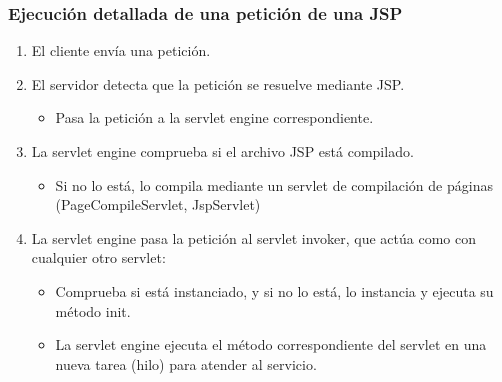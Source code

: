 \documentclass{apuntes}
\begin{document}
\subsubsection{Ejecución detallada de una petición de una JSP}
\begin{enumerate}
\item El cliente envía una petición.
\item El servidor detecta que la petición se resuelve mediante JSP.
\begin{itemize}
\item Pasa la petición a la servlet engine correspondiente.
\end{itemize}
\item La servlet engine comprueba si el archivo JSP está compilado.
\begin{itemize}
\item Si no lo está, lo compila mediante un servlet de compilación de páginas (PageCompileServlet, JspServlet)
\end{itemize}
\item La servlet engine pasa la petición al servlet invoker, que actúa como con cualquier otro servlet:
\begin{itemize}
\item Comprueba si está instanciado, y si no lo está, lo instancia y ejecuta su método init.
\item La servlet engine ejecuta el método correspondiente del servlet en una nueva tarea (hilo) para atender al servicio.
\end{itemize}

\end{enumerate}
\normalsize
\printindex
\end{document}
